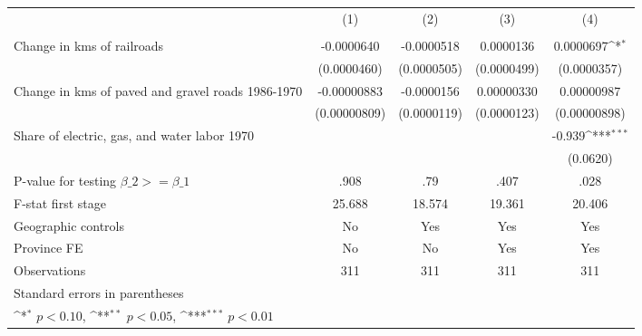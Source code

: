 {
\def\sym#1{\ifmmode^{#1}\else\(^{#1}\)\fi}
\begin{tabular}{l*{4}{c}}
\hline\hline
                &\multicolumn{1}{c}{(1)}&\multicolumn{1}{c}{(2)}&\multicolumn{1}{c}{(3)}&\multicolumn{1}{c}{(4)}\\
                &\multicolumn{1}{c}{}&\multicolumn{1}{c}{}&\multicolumn{1}{c}{}&\multicolumn{1}{c}{}\\
\hline
Change in kms of railroads&-0.0000640         &-0.0000518         &0.0000136         &0.0000697\sym{*}  \\
                &(0.0000460)         &(0.0000505)         &(0.0000499)         &(0.0000357)         \\
[1em]
Change in kms of paved and gravel roads 1986-1970&-0.00000883         &-0.0000156         &0.00000330         &0.00000987         \\
                &(0.00000809)         &(0.0000119)         &(0.0000123)         &(0.00000898)         \\
[1em]
Share of electric, gas, and water labor 1970&                  &                  &                  &   -0.939\sym{***}\\
                &                  &                  &                  & (0.0620)         \\
\hline
P-value for testing $\beta\_{2} >= \beta\_{1}$&     .908         &      .79         &     .407         &     .028         \\
F-stat first stage&   25.688         &   18.574         &   19.361         &   20.406         \\
Geographic controls&       No         &      Yes         &      Yes         &      Yes         \\
Province FE     &       No         &       No         &      Yes         &      Yes         \\
Observations    &      311         &      311         &      311         &      311         \\
\hline\hline
\multicolumn{5}{l}{\footnotesize Standard errors in parentheses}\\
\multicolumn{5}{l}{\footnotesize \sym{*} \(p<0.10\), \sym{**} \(p<0.05\), \sym{***} \(p<0.01\)}\\
\end{tabular}
}
